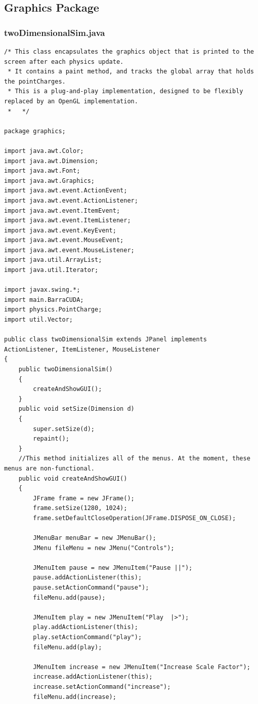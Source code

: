\documentclass[10pt]{article}
\begin{document}
\subsection{Graphics Package}
\subsubsection{twoDimensionalSim.java}
\tiny
\begin{verbatim}
/* This class encapsulates the graphics object that is printed to the screen after each physics update.
 * It contains a paint method, and tracks the global array that holds the pointCharges.
 * This is a plug-and-play implementation, designed to be flexibly replaced by an OpenGL implementation.
 *   */

package graphics;

import java.awt.Color;
import java.awt.Dimension;
import java.awt.Font;
import java.awt.Graphics;
import java.awt.event.ActionEvent;
import java.awt.event.ActionListener;
import java.awt.event.ItemEvent;
import java.awt.event.ItemListener;
import java.awt.event.KeyEvent;
import java.awt.event.MouseEvent;
import java.awt.event.MouseListener;
import java.util.ArrayList;
import java.util.Iterator;

import javax.swing.*;
import main.BarraCUDA;
import physics.PointCharge;
import util.Vector;

public class twoDimensionalSim extends JPanel implements ActionListener, ItemListener, MouseListener
{
	public twoDimensionalSim()
	{
		createAndShowGUI();	
	}
	public void setSize(Dimension d)
	{
		super.setSize(d);
		repaint();
	}
	//This method initializes all of the menus. At the moment, these menus are non-functional.
	public void createAndShowGUI()
	{
		JFrame frame = new JFrame();
		frame.setSize(1280, 1024);
		frame.setDefaultCloseOperation(JFrame.DISPOSE_ON_CLOSE);

		JMenuBar menuBar = new JMenuBar();
		JMenu fileMenu = new JMenu("Controls");

		JMenuItem pause = new JMenuItem("Pause ||");
		pause.addActionListener(this);
		pause.setActionCommand("pause");
		fileMenu.add(pause);

		JMenuItem play = new JMenuItem("Play  |>");
		play.addActionListener(this);
		play.setActionCommand("play");
		fileMenu.add(play);

		JMenuItem increase = new JMenuItem("Increase Scale Factor");
		increase.addActionListener(this);
		increase.setActionCommand("increase");
		fileMenu.add(increase);
		

\end{verbatim}
\end{document}
